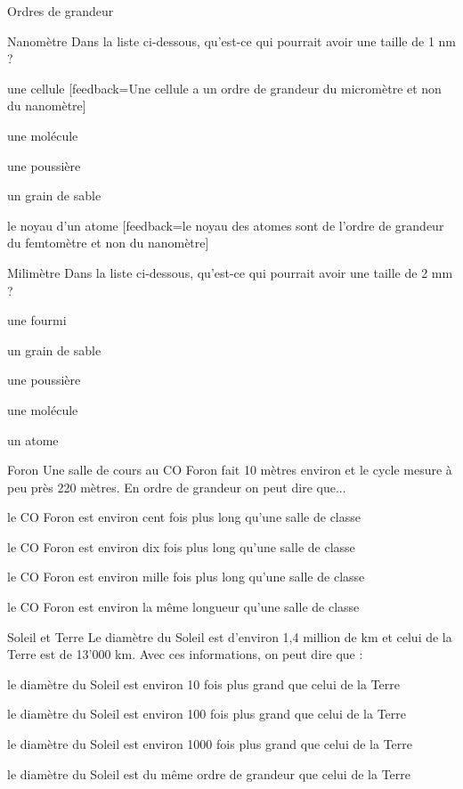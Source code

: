\documentclass[12pt]{article}
\begin{document}
\begin{quiz}{Ordres de grandeur}
\begin{multi}[points=1]{Nanomètre}
Dans la liste ci-dessous, qu'est-ce qui pourrait avoir une taille de 1 nm ?
\item une cellule [feedback={Une cellule a un ordre de grandeur du micromètre et non du nanomètre}]
\item  * une molécule
\item une poussière
\item un grain de sable
\item le noyau d'un atome [feedback={le noyau des atomes sont de l'ordre de grandeur du femtomètre et non du nanomètre}]
\end{multi}

\begin{multi}[points=1]{Milimètre}
Dans la liste ci-dessous, qu'est-ce qui pourrait avoir une taille de 2 mm ?
\item une fourmi
\item   * un grain de sable 
\item une poussière
\item une molécule
\item un atome
\end{multi}

\begin{multi}[points=1]{Foron}
Une salle de cours au CO Foron fait 10 mètres environ et le cycle mesure à peu près 220 mètres. En ordre de grandeur on peut dire que...
\item le CO Foron est environ cent fois plus long qu'une salle de classe
\item * le CO Foron est environ dix fois plus long qu'une salle de classe
\item le CO Foron est environ mille fois plus long qu'une salle de classe
\item le CO Foron est environ la même longueur qu'une salle de classe
\end{multi}

\begin{multi}[points=1]{Soleil et Terre}
Le diamètre du Soleil est d'environ 1,4 million de km et celui de la Terre est de 13'000 km. Avec ces informations, on peut dire que :
\item le diamètre du Soleil est environ 10 fois plus grand que celui de la Terre
\item * le diamètre du Soleil est environ 100 fois plus grand que celui de la Terre
\item le diamètre du Soleil est environ 1000 fois plus grand que celui de la Terre
\item le diamètre du Soleil est du même ordre de grandeur que celui de la Terre
\end{multi}


\end{quiz}
\end{document}
